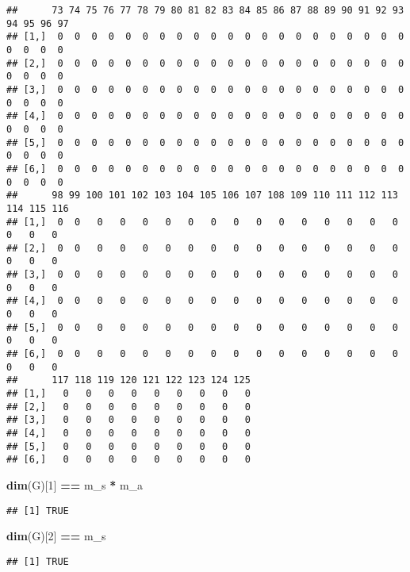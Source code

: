 \documentclass[
]{book}
\newenvironment{Shaded}{\begin{snugshade}}{\end{snugshade}}
\newcommand{\DecValTok}[1]{\textcolor[rgb]{0.00,0.00,0.81}{#1}}
\newcommand{\FunctionTok}[1]{\textcolor[rgb]{0.13,0.29,0.53}{\textbf{#1}}}
\newcommand{\NormalTok}[1]{#1}
\newcommand{\SpecialCharTok}[1]{\textcolor[rgb]{0.81,0.36,0.00}{\textbf{#1}}}
\begin{document}
\begin{verbatim}
##      73 74 75 76 77 78 79 80 81 82 83 84 85 86 87 88 89 90 91 92 93 94 95 96 97
## [1,]  0  0  0  0  0  0  0  0  0  0  0  0  0  0  0  0  0  0  0  0  0  0  0  0  0
## [2,]  0  0  0  0  0  0  0  0  0  0  0  0  0  0  0  0  0  0  0  0  0  0  0  0  0
## [3,]  0  0  0  0  0  0  0  0  0  0  0  0  0  0  0  0  0  0  0  0  0  0  0  0  0
## [4,]  0  0  0  0  0  0  0  0  0  0  0  0  0  0  0  0  0  0  0  0  0  0  0  0  0
## [5,]  0  0  0  0  0  0  0  0  0  0  0  0  0  0  0  0  0  0  0  0  0  0  0  0  0
## [6,]  0  0  0  0  0  0  0  0  0  0  0  0  0  0  0  0  0  0  0  0  0  0  0  0  0
##      98 99 100 101 102 103 104 105 106 107 108 109 110 111 112 113 114 115 116
## [1,]  0  0   0   0   0   0   0   0   0   0   0   0   0   0   0   0   0   0   0
## [2,]  0  0   0   0   0   0   0   0   0   0   0   0   0   0   0   0   0   0   0
## [3,]  0  0   0   0   0   0   0   0   0   0   0   0   0   0   0   0   0   0   0
## [4,]  0  0   0   0   0   0   0   0   0   0   0   0   0   0   0   0   0   0   0
## [5,]  0  0   0   0   0   0   0   0   0   0   0   0   0   0   0   0   0   0   0
## [6,]  0  0   0   0   0   0   0   0   0   0   0   0   0   0   0   0   0   0   0
##      117 118 119 120 121 122 123 124 125
## [1,]   0   0   0   0   0   0   0   0   0
## [2,]   0   0   0   0   0   0   0   0   0
## [3,]   0   0   0   0   0   0   0   0   0
## [4,]   0   0   0   0   0   0   0   0   0
## [5,]   0   0   0   0   0   0   0   0   0
## [6,]   0   0   0   0   0   0   0   0   0
\end{verbatim}

\begin{Shaded}
\begin{Highlighting}[]
\FunctionTok{dim}\NormalTok{(G)[}\DecValTok{1}\NormalTok{] }\SpecialCharTok{==}\NormalTok{ m\_s }\SpecialCharTok{*}\NormalTok{ m\_a}
\end{Highlighting}
\end{Shaded}

\begin{verbatim}
## [1] TRUE
\end{verbatim}

\begin{Shaded}
\begin{Highlighting}[]
\FunctionTok{dim}\NormalTok{(G)[}\DecValTok{2}\NormalTok{] }\SpecialCharTok{==}\NormalTok{ m\_s}
\end{Highlighting}
\end{Shaded}

\begin{verbatim}
## [1] TRUE
\end{verbatim}
\end{document}
